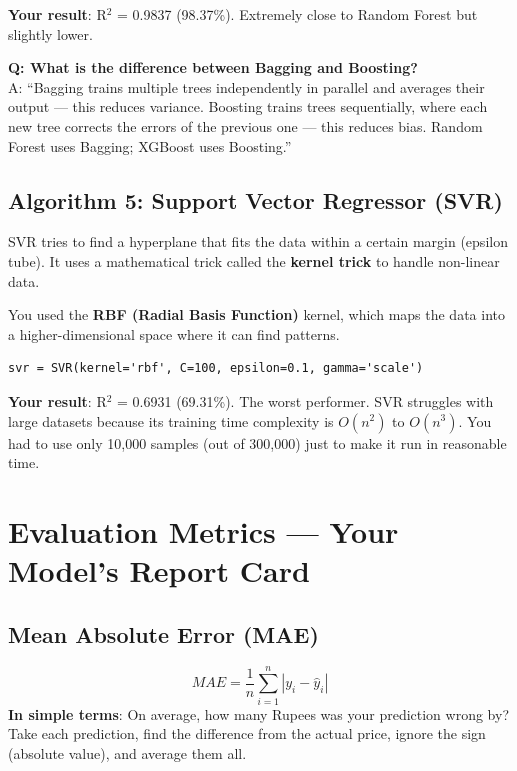 \documentclass[12pt, a4paper]{article}
\begin{document}
\textbf{Your result}: R$^2$ = 0.9837 (98.37\%). Extremely close to Random Forest but slightly lower.

\begin{warnbox}
    \textbf{Q: What is the difference between Bagging and Boosting?} \\
    A: ``Bagging trains multiple trees independently in parallel and averages their output — this reduces variance. Boosting trains trees sequentially, where each new tree corrects the errors of the previous one — this reduces bias. Random Forest uses Bagging; XGBoost uses Boosting.''
\end{warnbox}


\subsection{Algorithm 5: Support Vector Regressor (SVR)}

\begin{conceptbox}
    SVR tries to find a hyperplane that fits the data within a certain margin (epsilon tube). It uses a mathematical trick called the \textbf{kernel trick} to handle non-linear data.

    You used the \textbf{RBF (Radial Basis Function)} kernel, which maps the data into a higher-dimensional space where it can find patterns.
\end{conceptbox}

\begin{lstlisting}
svr = SVR(kernel='rbf', C=100, epsilon=0.1, gamma='scale')
\end{lstlisting}

\textbf{Your result}: R$^2$ = 0.6931 (69.31\%). The worst performer. SVR struggles with large datasets because its training time complexity is $O(n^2)$ to $O(n^3)$. You had to use only 10,000 samples (out of 300,000) just to make it run in reasonable time.


\section{Evaluation Metrics — Your Model's Report Card}

\subsection{Mean Absolute Error (MAE)}
\[
    MAE = \frac{1}{n} \sum_{i=1}^{n} |y_i - \hat{y}_i|
\]
\textbf{In simple terms}: On average, how many Rupees was your prediction wrong by? Take each prediction, find the difference from the actual price, ignore the sign (absolute value), and average them all.
\end{document}
